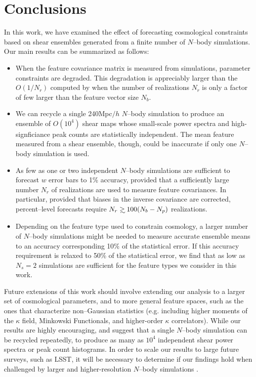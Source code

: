 \documentclass[reprint,aps,prd,superscriptaddress,showkeys,showpacs]{revtex4-1}
\newcommand\gsim{\mathrel{\rlap{\lower4pt\hbox{\hskip1pt$\sim$}}
        \raise1pt\hbox{$>$}}}
\begin{document}

\section{Conclusions}

In this work, we have examined the effect of forecasting cosmological
constraints based on shear ensembles generated from a finite number of
$N$--body simulations.  Our main results can be summarized as follows:
\vspace{0.4\baselineskip}
\begin{itemize}

\item When the feature covariance matrix is measured from simulations,
  parameter constraints are degraded. This degradation is appreciably
  larger than the $O(1/N_r)$ computed by \citep{DodelsonSchneider13}
  when the number of realizations $N_r$ is only a factor of few larger
  than the feature vector size $N_b$.
\item We can recycle a single 240Mpc$/h$ $N$--body simulation to produce an
  ensemble of $O(10^4)$ shear maps whose small-scale power spectra and high-signficiance peak counts are statistically independent. The mean feature measured from a shear ensemble, though, could be inaccurate if only one $N$--body simulation is used.
\item As few as one or two independent $N$--body simulations are
  sufficient to forecast $w$ error bars to 1\% accuracy, provided that
  a sufficiently large number $N_r$ of realizations are used to
  measure feature covariances.  In particular, provided that biases
  in the inverse covariance are corrected, percent--level forecasts
  require $N_r\gsim 100 (N_b-N_p)$ realizations.
\item Depending on the feature type used to constrain cosmology, a
  larger number of $N$--body simulations might be needed to measure
  accurate ensemble means to an accuracy corresponding 10\% of the
  statistical error. If this accuracy requirement is relaxed to 50\%
  of the statistical error, we find that as low as $N_s=2$ simulations
  are sufficient for the feature types we consider in this work.
\end{itemize}
%
Future extensions of this work should involve extending our analysis
to a larger set of cosmological parameters, and to more general
feature spaces, such as the ones that characterize non--Gaussian
statistics (e.g. including higher moments of the $\kappa$ field,
Minkowski Functionals, and higher-order $\kappa$ correlators). While
our results are highly encouraging, and suggest that a single $N$--body
simulation can be recycled repeatedly, to produce as many as $10^4$
independent shear power spectra or peak count histograms. In order to
scale our results to large future surveys, such as LSST, it will be
necessary to determine if our findings hold when challenged by larger
and higher-resolution $N$--body simulations \citep{Qcontinuum}.
\end{document}
